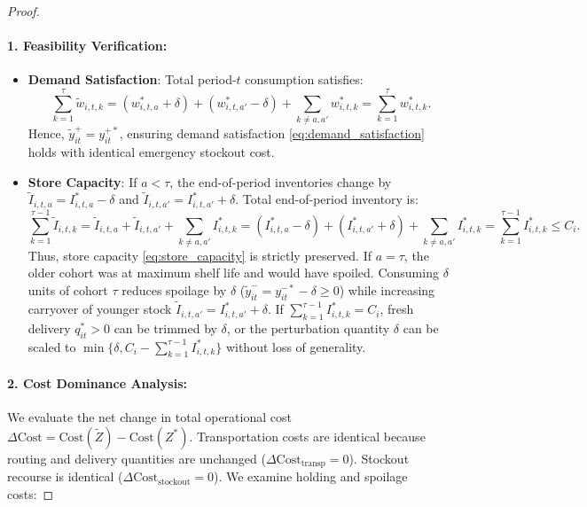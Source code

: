 \documentclass[11pt,a4paper]{article}
\theoremstyle{definition}
\theoremstyle{remark}
\begin{document}
\begin{proof}
\paragraph{1. Feasibility Verification:}
\begin{itemize}[leftmargin=*]
    \item \textbf{Demand Satisfaction}: Total period-$t$ consumption satisfies:
    \begin{equation*}
        \sum_{k=1}^\tau \tilde{w}_{i,t,k} = (w_{i,t,a}^* + \delta) + (w_{i,t,a'}^* - \delta) + \sum_{k \neq a, a'} w_{i,t,k}^* = \sum_{k=1}^\tau w_{i,t,k}^*.
    \end{equation*}
    Hence, $\tilde{y}_{it}^+ = y_{it}^{+*}$, ensuring demand satisfaction \eqref{eq:demand_satisfaction} holds with identical emergency stockout cost.
    \item \textbf{Store Capacity}: If $a < \tau$, the end-of-period inventories change by $\tilde{I}_{i,t,a} = I_{i,t,a}^* - \delta$ and $\tilde{I}_{i,t,a'} = I_{i,t,a'}^* + \delta$. Total end-of-period inventory is:
    \begin{equation*}
        \sum_{k=1}^{\tau-1} \tilde{I}_{i,t,k} = \tilde{I}_{i,t,a} + \tilde{I}_{i,t,a'} + \sum_{k \neq a, a'} I_{i,t,k}^* = (I_{i,t,a}^* - \delta) + (I_{i,t,a'}^* + \delta) + \sum_{k \neq a, a'} I_{i,t,k}^* = \sum_{k=1}^{\tau-1} I_{i,t,k}^* \le C_i.
    \end{equation*}
    Thus, store capacity \eqref{eq:store_capacity} is strictly preserved. If $a = \tau$, the older cohort was at maximum shelf life and would have spoiled. Consuming $\delta$ units of cohort $\tau$ reduces spoilage by $\delta$ ($\tilde{y}_{it}^- = y_{it}^{-*} - \delta \ge 0$) while increasing carryover of younger stock $\tilde{I}_{i,t,a'} = I_{i,t,a'}^* + \delta$. If $\sum_{k=1}^{\tau-1} I_{i,t,k}^* = C_i$, fresh delivery $q_{it}^* > 0$ can be trimmed by $\delta$, or the perturbation quantity $\delta$ can be scaled to $\min\{\delta, C_i - \sum_{k=1}^{\tau-1} I_{i,t,k}^*\}$ without loss of generality.
\end{itemize}

\paragraph{2. Cost Dominance Analysis:}
We evaluate the net change in total operational cost $\Delta \text{Cost} = \text{Cost}(\tilde{Z}) - \text{Cost}(Z^*)$. Transportation costs are identical because routing and delivery quantities are unchanged ($\Delta \text{Cost}_{\text{transp}} = 0$). Stockout recourse is identical ($\Delta \text{Cost}_{\text{stockout}} = 0$). We examine holding and spoilage costs:


\end{proof}
\end{document}
